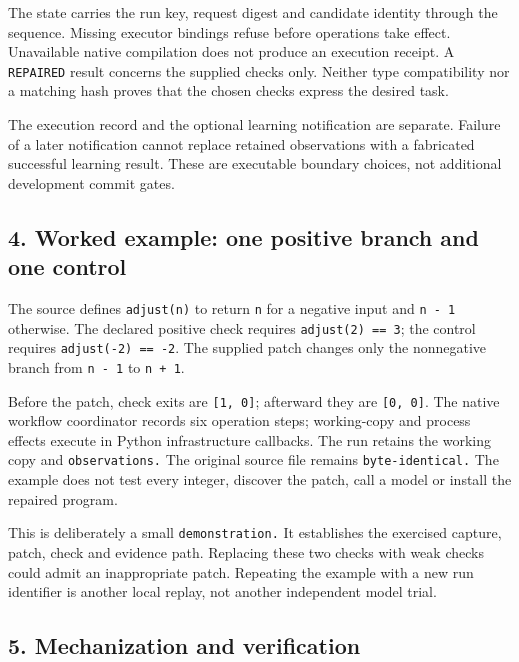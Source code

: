 \documentclass[
  11pt,
]{article}
\newcommand{\passthrough}[1]{#1}
\begin{document}
The state carries the run key, request digest and candidate identity
through the sequence. Missing executor bindings refuse before operations
take effect. Unavailable native compilation does not produce an
execution receipt. A \passthrough{\lstinline!REPAIRED!} result concerns
the supplied checks only. Neither type compatibility nor a matching hash
proves that the chosen checks express the desired task.

The execution record and the optional learning notification are
separate. Failure of a later notification cannot replace retained
observations with a fabricated successful learning result. These are
executable boundary choices, not additional development commit gates.

\subsection{4. Worked example: one positive branch and one
control}\label{worked-example-one-positive-branch-and-one-control}

The source defines \passthrough{\lstinline!adjust(n)!} to return
\passthrough{\lstinline!n!} for a negative input and
\passthrough{\lstinline!n - 1!} otherwise. The declared positive check
requires \passthrough{\lstinline!adjust(2) == 3!}; the control requires
\passthrough{\lstinline!adjust(-2) == -2!}. The supplied patch changes
only the nonnegative branch from \passthrough{\lstinline!n - 1!} to
\passthrough{\lstinline!n + 1!}.

Before the patch, check exits are \passthrough{\lstinline![1, 0]!};
afterward they are \passthrough{\lstinline![0, 0]!}. The native workflow
coordinator records six operation steps; working-copy and process
effects execute in Python infrastructure callbacks. The run retains the
working copy and \nolinkurl{observations.} The original source file
remains \nolinkurl{byte-identical.} The example does not test every
integer, discover the patch, call a model or install the repaired
program.

This is deliberately a small \nolinkurl{demonstration.} It establishes
the exercised capture, patch, check and evidence path. Replacing these
two checks with weak checks could admit an inappropriate patch.
Repeating the example with a new run identifier is another local replay,
not another independent model trial.

\subsection{5. Mechanization and
verification}\label{mechanization-and-verification}
\end{document}
